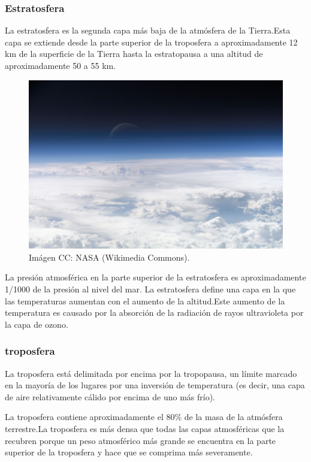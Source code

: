 \documentclass{article} %
\begin{document}
\subsubsection{Estratosfera}
La estratosfera es la segunda capa más baja de la atmósfera de la Tierra.Esta capa se extiende desde la parte superior de la troposfera a aproximadamente 12 km de la superficie de la Tierra hasta la estratopausa a una altitud de aproximadamente 50 a 55 km.

\begin{figure}[ht!]
  \includegraphics[width=\linewidth]{cielo.jpg}
  \caption{Imágen CC: NASA (Wikimedia Commons).}
  \label{fig:cielo1}
\end{figure}

La presión atmosférica en la parte superior de la estratosfera es aproximadamente 1/1000 de la presión al nivel del mar. La estratosfera define una capa en la que las temperaturas aumentan con el aumento de la altitud.Este aumento de la temperatura es causado por la absorción de la radiación de rayos ultravioleta por la capa de ozono.

\subsubsection{troposfera}
 La troposfera está delimitada por encima por la tropopausa, un límite marcado en la mayoría de los lugares por una inversión de temperatura (es decir, una capa de aire relativamente cálido por encima de uno más frío).

La troposfera contiene aproximadamente el 80\% de la masa de la atmósfera terrestre.La troposfera es más densa que todas las capas atmosféricas que la recubren porque un peso atmosférico más grande se encuentra en la parte superior de la troposfera y hace que se comprima más severamente.
\end{document}
